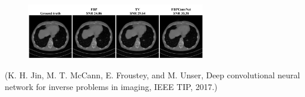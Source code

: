 \begin{concept}
    \begin{figure}[H]
        \centering
        \includegraphics[width=0.7\textwidth]{.././assets/8.29.png}
    \end{figure}

    (K. H. Jin, M. T. McCann, E. Froustey, and M. Unser, Deep convolutional neural network for inverse problems in imaging, IEEE TIP, 2017.)
\end{concept}
